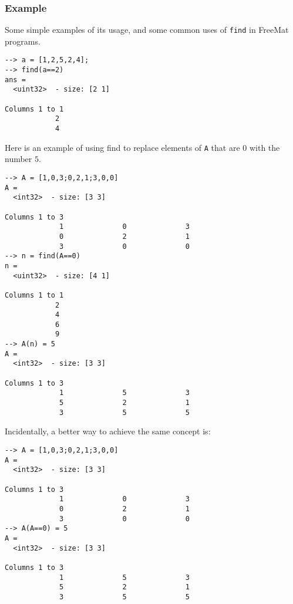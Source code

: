 \subsubsection{Example}
Some simple examples of its usage, and some common uses of \verb|find| in FreeMat programs.
\begin{verbatim}
--> a = [1,2,5,2,4];
--> find(a==2)
ans =
  <uint32>  - size: [2 1]
  
Columns 1 to 1
            2
            4
\end{verbatim}
Here is an example of using find to replace elements of \verb|A| that are $0$ with the number $5$.
\begin{verbatim}
--> A = [1,0,3;0,2,1;3,0,0]
A =
  <int32>  - size: [3 3]
  
Columns 1 to 3
             1              0              3
             0              2              1
             3              0              0
--> n = find(A==0)
n =
  <uint32>  - size: [4 1]
  
Columns 1 to 1
            2
            4
            6
            9
--> A(n) = 5
A =
  <int32>  - size: [3 3]
  
Columns 1 to 3
             1              5              3
             5              2              1
             3              5              5
\end{verbatim}
Incidentally, a better way to achieve the same concept is:
\begin{verbatim}
--> A = [1,0,3;0,2,1;3,0,0]
A =
  <int32>  - size: [3 3]
                                                                                
Columns 1 to 3
             1              0              3
             0              2              1
             3              0              0
--> A(A==0) = 5
A =
  <int32>  - size: [3 3]
  
Columns 1 to 3
             1              5              3
             5              2              1
             3              5              5
\end{verbatim}
